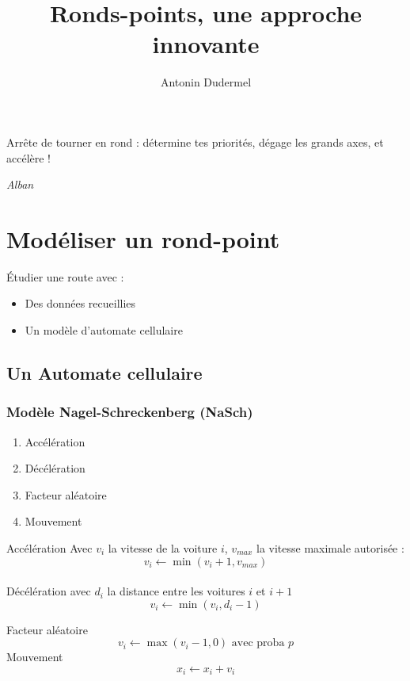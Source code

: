 \documentclass[slidetop,11pt]{beamer}
\title{Ronds-points, une approche innovante}
\date{}
\author{Antonin Dudermel}
\begin{document}

\frame{\titlepage}

\begin{frame}
	\epigraph{Arrête de tourner en rond : détermine tes priorités, dégage les grands axes, et accélère !}{\it Alban}
\end{frame}

\begin{frame}
	\tableofcontents
\end{frame}

\section{Modéliser un rond-point}
\begin{frame}
	Étudier une route avec :
		\begin{itemize}
			\item Des données recueillies
			\item Un modèle d'automate cellulaire
		\end{itemize}
\end{frame}

	\subsection{Un Automate cellulaire}
		\begin{frame}
	\frametitle{Modèle Nagel-Schreckenberg (NaSch)}
	\begin{enumerate}
		\item Accélération 
		\item Décélération
		\item Facteur aléatoire
		\item Mouvement
	\end{enumerate}
\end{frame}

\begin{frame}
Accélération
	Avec $v_i$ la vitesse de la voiture $i$, $v_{max}$ la vitesse maximale autorisée : 
	\begin{equation}
		v_i \leftarrow \min (v_i+1,v_{max})
	\end{equation}
\\

Décélération
	avec $d_i$ la distance entre les voitures $i$ et $i+1$
	\begin{equation}
		v_i \leftarrow \min (v_i,d_i-1)
	\end{equation}


Facteur aléatoire
	\begin{equation}
		v_i \leftarrow \max(v_i-1,0) \text{ avec proba } p
	\end{equation}
	Mouvement
	\begin{equation}
		x_i \leftarrow x_i + v_i
	\end{equation}
\end{frame}
\end{document}
